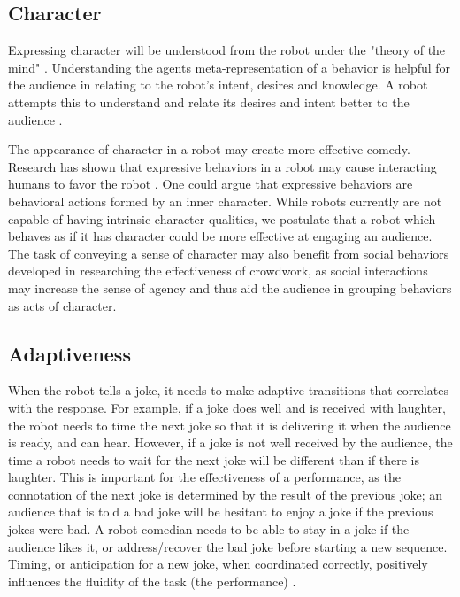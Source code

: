 \documentclass[onecolumn, draftclsnofoot,10pt, compsoc]{IEEEtran}
\begin{document}
\subsection{Character}
Expressing character will be understood from the robot under the "theory of the mind" \cite{leslie}. Understanding the agents meta-representation of a behavior is helpful for the audience in relating to the robot's intent, desires and knowledge. A robot attempts this to understand and relate its desires and intent better to the audience \cite{theoryOfMindRobots}.


The appearance of character in a robot may create more effective comedy.
Research has shown that expressive behaviors in a robot may cause interacting humans to favor the robot \cite{DesignExBeh:2017}.
One could argue that expressive behaviors are behavioral actions formed by an inner character. While robots currently are not capable of having intrinsic character qualities, we postulate that a robot which behaves as if it has character could be more effective at engaging an audience. The task of conveying a sense of character may also benefit from social behaviors developed in researching the effectiveness of crowdwork, as social interactions may increase the sense of agency \cite{KnightEightLessons} and thus aid the audience in grouping behaviors as acts of character.  



\subsection{Adaptiveness}




When the robot tells a joke, it needs to make adaptive transitions that correlates with the response. For example, if a joke does well and is received with laughter, the robot needs to time the next joke so that it is delivering it when the audience is ready, and can hear. However, if a joke is not well received by the audience, the time a robot needs to wait for the next joke will be different than if there is laughter. This is important for the effectiveness of a performance, as the connotation of the next joke is determined by the result of the previous joke; an audience that is told a bad joke will be hesitant to enjoy a joke if the previous jokes were bad. A robot comedian needs to be able to stay in a joke if the audience likes it, or address/recover the bad joke before starting a new sequence. Timing, or anticipation for a new joke, when coordinated correctly, positively influences the fluidity of the task (the performance) \cite{hoffman2010anticipation}.
\end{document}
